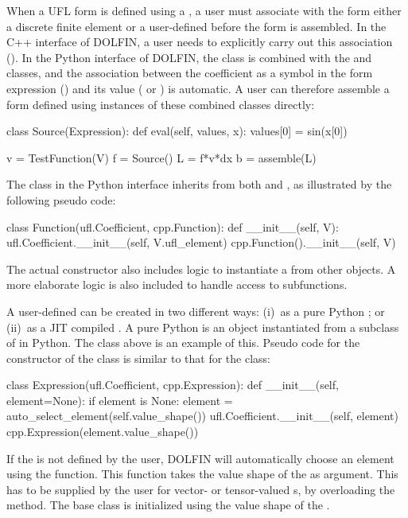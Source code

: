 When a UFL form is defined using a , a user must
associate with the form either a discrete finite element
 or a user-defined  before the form is
assembled. In the C++ interface of DOLFIN, a user needs to explicitly
carry out this association (). In the Python interface of
DOLFIN, the  class is combined with the \dolfin
{} and  classes, and the association
between the coefficient as a symbol in the form expression
() and its value ( or )
is automatic. A user can therefore assemble a form defined using
instances of these combined classes directly:
\begin{python}
class Source(Expression):
    def eval(self, values, x):
        values[0] = sin(x[0])

v = TestFunction(V)
f = Source()
L = f*v*dx
b = assemble(L)
\end{python}
The  class in the Python interface inherits from both
 and , as illustrated by the
following pseudo code:
\begin{python}
class Function(ufl.Coefficient, cpp.Function):
    def __init__(self, V):
        ufl.Coefficient.__init__(self, V.ufl_element)
        cpp.Function().__init__(self, V)
\end{python}
The actual constructor also includes logic to instantiate a 
from other objects. A more elaborate logic is also included to handle
access to subfunctions.

A user-defined  can be created in two different ways:
(i)~as a pure Python ; or (ii)~as a JIT compiled
. A pure Python  is an object instantiated
from a subclass of  in Python. The  class
above is an example of this. Pseudo code for the constructor of the
 class is similar to that for the  class:
\begin{python}
class Expression(ufl.Coefficient, cpp.Expression):
    def __init__(self, element=None):
        if element is None:
            element = auto_select_element(self.value_shape())
        ufl.Coefficient.__init__(self, element)
        cpp.Expression(element.value_shape())
\end{python}
If the  is not defined by the user, DOLFIN will
automatically choose an element using the 
function. This function takes the value shape of the 
as argument. This has to be supplied by the user for vector- or
tensor-valued s, by overloading the 
method. The base class  is initialized using the
value shape of the .

